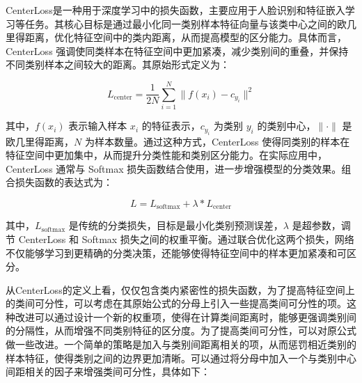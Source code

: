 CenterLoss\cite{wen2016discriminative}是一种用于深度学习中的损失函数，主要应用于人脸识别和特征嵌入学习等任务。其核心目标是通过最小化同一类别样本特征向量与该类中心之间的欧几里得距离，优化特征空间中的类内距离，从而提高模型的区分能力。具体而言，CenterLoss 强调使同类样本在特征空间中更加紧凑，减少类别间的重叠，并保持不同类别样本之间较大的距离。其原始形式定义为：

\[
L_{\text{center}} = \frac{1}{2N} \sum_{i=1}^{N} \| f(x_i) - c_{y_i} \|^2
\]

其中，\( f(x_i) \) 表示输入样本 \( x_i \) 的特征表示，\( c_{y_i} \) 为类别 \( y_i \) 的类别中心，\(\|\cdot\|\) 是欧几里得距离，\( N \) 为样本数量。通过这种方式，CenterLoss 使得同类别的样本在特征空间中更加集中，从而提升分类性能和类别区分能力。在实际应用中，CenterLoss 通常与 Softmax 损失函数结合使用，进一步增强模型的分类效果。组合损失函数的表达式为：

\[
L = L_{\text{softmax}} + \lambda * L_{\text{center}}
\]

其中，\(L_{\text{softmax}}\) 是传统的分类损失，目标是最小化类别预测误差，\(\lambda\) 是超参数，调节 CenterLoss 和 Softmax 损失之间的权重平衡。通过联合优化这两个损失，网络不仅能够学习到更精确的分类决策，还能够使得特征空间中的样本更加紧凑和可区分。






从CenterLoss的定义上看，仅仅包含类内紧密性的损失函数，为了提高特征空间上的类间可分性，可以考虑在其原始公式的分母上引入一些提高类间可分性的项。这种改进可以通过设计一个新的权重项，使得在计算类间距离时，能够更强调类别间的分隔性，从而增强不同类别特征的区分度。为了提高类间可分性，可以对原公式做一些改进。一个简单的策略是加入与类别间距离相关的项，从而惩罚相近类别的样本特征，使得类别之间的边界更加清晰。可以通过将分母中加入一个与类别中心间距相关的因子来增强类间可分性，具体如下：

